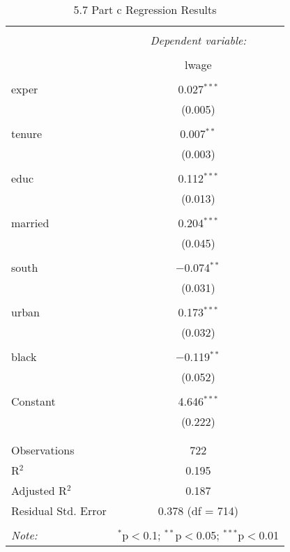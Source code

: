 \documentclass[11pt]{article} %
\begin{document}
\begin{table}[!htbp] \centering 
   \caption{5.7 Part c Regression Results} 
   \label{table:5.7:partd} 
 \begin{tabular}{@{\extracolsep{5pt}}lc} 
 \\[-1.8ex]\hline 
 \hline \\[-1.8ex] 
  & \multicolumn{1}{c}{\textit{Dependent variable:}} \\ 
 \cline{2-2} 
 \\[-1.8ex] & lwage \\ 
 \hline \\[-1.8ex] 
  exper & 0.027$^{***}$ \\ 
   & (0.005) \\ 
   & \\ 
  tenure & 0.007$^{**}$ \\ 
   & (0.003) \\ 
   & \\ 
  educ & 0.112$^{***}$ \\ 
   & (0.013) \\ 
   & \\ 
  married & 0.204$^{***}$ \\ 
   & (0.045) \\ 
   & \\ 
  south & $-$0.074$^{**}$ \\ 
   & (0.031) \\ 
   & \\ 
  urban & 0.173$^{***}$ \\ 
   & (0.032) \\ 
   & \\ 
  black & $-$0.119$^{**}$ \\ 
   & (0.052) \\ 
   & \\ 
  Constant & 4.646$^{***}$ \\ 
   & (0.222) \\ 
   & \\ 
 \hline \\[-1.8ex] 
 Observations & 722 \\ 
 R$^{2}$ & 0.195 \\ 
 Adjusted R$^{2}$ & 0.187 \\ 
 Residual Std. Error & 0.378 (df = 714) \\ 
 \hline 
 \hline \\[-1.8ex] 
 \textit{Note:}  & \multicolumn{1}{r}{$^{*}$p$<$0.1; $^{**}$p$<$0.05; $^{***}$p$<$0.01} \\ 
 \end{tabular} 
 \end{table} 
\end{document}
